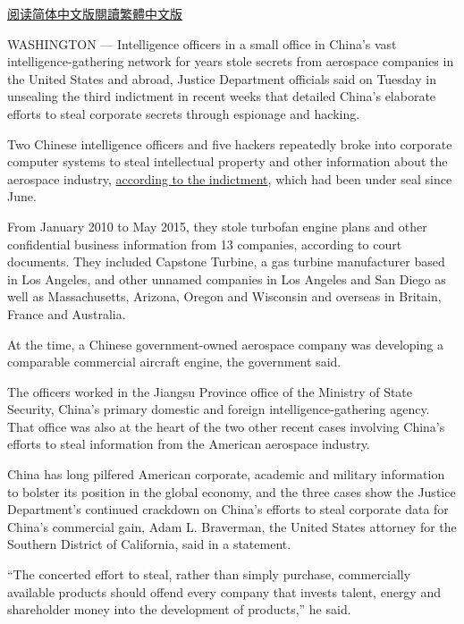 \href{https://cn.nytimes.com/usa/20181031/justice-department-china-espionage/}{阅读简体中文版}\href{https://cn.nytimes.com/usa/20181031/justice-department-china-espionage/zh-hant/}{閱讀繁體中文版}

WASHINGTON --- Intelligence officers in a small office in China's vast
intelligence-gathering network for years stole secrets from aerospace
companies in the United States and abroad, Justice Department officials
said on Tuesday in unsealing the third indictment in recent weeks that
detailed China's elaborate efforts to steal corporate secrets through
espionage and hacking.

Two Chinese intelligence officers and five hackers repeatedly broke into
corporate computer systems to steal intellectual property and other
information about the aerospace industry,
\href{https://int.nyt.com/data/documenthelper/462-chinese-intelligence-officers-indictment/e73abcf72e5df6c6a996/optimized/full.pdf\#page=1}{according
to the indictment}, which had been under seal since June.

From January 2010 to May 2015, they stole turbofan engine plans and
other confidential business information from 13 companies, according to
court documents. They included Capstone Turbine, a gas turbine
manufacturer based in Los Angeles, and other unnamed companies in Los
Angeles and San Diego as well as Massachusetts, Arizona, Oregon and
Wisconsin and overseas in Britain, France and Australia.

At the time, a Chinese government-owned aerospace company was developing
a comparable commercial aircraft engine, the government said.

The officers worked in the Jiangsu Province office of the Ministry of
State Security, China's primary domestic and foreign
intelligence-gathering agency. That office was also at the heart of the
two other recent cases involving China's efforts to steal information
from the American aerospace industry.

China has long pilfered American corporate, academic and military
information to bolster its position in the global economy, and the three
cases show the Justice Department's continued crackdown on China's
efforts to steal corporate data for China's commercial gain, Adam L.
Braverman, the United States attorney for the Southern District of
California, said in a statement.

``The concerted effort to steal, rather than simply purchase,
commercially available products should offend every company that invests
talent, energy and shareholder money into the development of products,''
he said.

